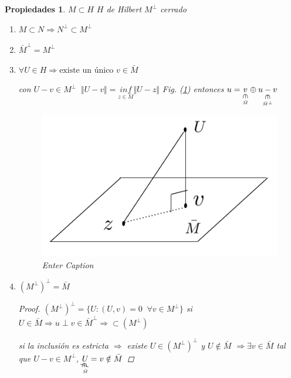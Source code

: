 \documentclass[a4paper,10pt]{book}
\newtheorem{propiedades}{Propiedades}
\newcommand{\rotin}{\mathbin{\rotatebox[origin=c]{270}{$\in$}}}
\newcommand{\rotnotin}{\mathbin{\rotatebox[origin=c]{270}{$\notin$}}}
\begin{document}
\begin{propiedades} $M\subset H$ $H$ de Hilbert  $M^\perp$ cerrado 
\begin{enumerate}
    \item $M\subset N \Rightarrow N^\perp \subset M^\perp$
    \item $\bar{M}^\perp = M^\perp$
    \item $\forall U \in H \Rightarrow \text{existe un único  } v \in \bar{M}$

    con $ U - v \in M^\perp \; \;  \Vert U-v\Vert = \underset{z\in \bar{M}}{inf} \Vert U-z\Vert$ Fig. (\ref{fig:3})
    entonces $u= \underset{\underset{\bar{M}}{\rotin}}{v} \oplus \underset{\underset{\bar{M}^\perp}{\rotin}}{u -v}$
    \begin{figure}
        \centering
        \includegraphics[width=0.5\linewidth]{Screen Shot 2024-02-10 at 18.39.45.png}
        \caption{Enter Caption}
        \label{fig:3}
    \end{figure}
    \item $(M^\perp ) ^\perp = \bar{M}$

    \begin{proof}
        $(M^\perp)^\perp = \{ U : (U,v) =0 \;\; \forall v \in M^\perp\}$ 
        si $U\in \bar{M} \Rightarrow u \perp v  \in  \bar{M}^\perp \Rightarrow \subset (M^\perp) $

        si la inclusión es estricta $\Rightarrow$ existe $U\in (M^\perp)^\perp $ y $U\notin \bar{M}$  $\Rightarrow \exists v \in \bar{M} $  tal que  
        $U-v \in M^\perp $, $\underset{\underset{\bar{M}}{\rotnotin}}{U} = v\notin \bar{M}$
    \end{proof}
    
\end{enumerate}
\end{propiedades}
    
\end{document}
